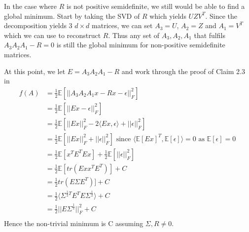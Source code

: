 \documentclass[12pt]{article}
\begin{document}
 In the case where $R$ is not positive semidefinite, we still would be able to find a global minimum. Start by taking the SVD of $R$ which yields $UZV^T$. Since the decomposition yields 3 $d \times d$ matrices, we can set $A_3 = U$, $A_2 = Z$ and $A_1 = V^T$ which we can use to reconstruct $R$. Thus any set of $A_3, A_2, A_1$ that fulfils $A_3 A_2 A_1 - R = 0$ is still the global minimum for non-positive semidefinite matrices.
 
 At this point, we let $E = A_3 A_2 A_1 - R$ and work through the proof of Claim 2.3 in \cite{hardt2016identity}
 \begin{align*}
 f(A) 
 &= \frac{1}{2}\mathbb{E}[|| A_3 A_2 A_1 x - Rx - \epsilon||_F^2]\\
 &= \frac{1}{2}\mathbb{E}[|| Ex - \epsilon||_F^2]\\
 &= \frac{1}{2}\mathbb{E}[|| Ex||_F^2 - 2\langle Ex, \epsilon \rangle + ||\epsilon||_F^2]\\
 &= \frac{1}{2}\mathbb{E}[|| Ex||_F^2 + ||\epsilon||_F^2] \textrm{ since } \langle \mathbb{E}[Ex]^T, \mathbb{E}[\epsilon]\rangle = 0 \textrm{ as } \mathbb{E}[\epsilon] = 0\ \\
 &= \frac{1}{2}\mathbb{E}[x^T E^T E x] + \frac{1}{2}\mathbb{E}[||\epsilon||_F^2] \\
 &= \frac{1}{2}\mathbb{E}[tr(E x x^T E^T)] + C \\
 &= \frac{1}{2}tr(E \Sigma E^T)] + C \\
 &= \frac{1}{2}\langle \Sigma^{\frac{1}{2}T} E^T E \Sigma^{\frac{1}{2}} \rangle + C \\
 &= \frac{1}{2} ||E \Sigma^{\frac{1}{2}}||_F^2 + C \\
 \end{align*}
 Hence the non-trivial minimum is C assuming $\Sigma, R \neq 0$.
 
\end{document}
